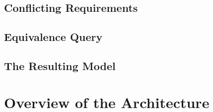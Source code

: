 \subsection{Conflicting Requirements} \label{subs_conf}

\subsection{Equivalence Query} \label{subs_eq}
\subsection{The Resulting Model} \label{subs_resultingmodel}

\section{Overview of the Architecture} \label{sec_architecture}
